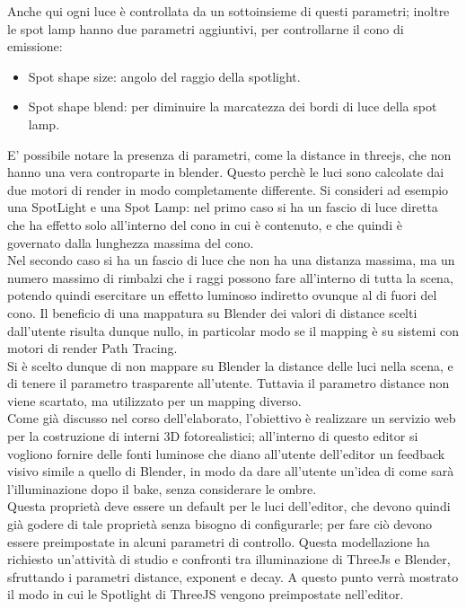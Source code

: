 Anche qui ogni luce è controllata da un sottoinsieme di questi parametri; inoltre le spot lamp hanno due parametri aggiuntivi, per controllarne il cono di emissione:
\begin{itemize}
\item Spot shape size: angolo del raggio della spotlight.
\item Spot shape blend: per diminuire la marcatezza dei bordi di luce della spot lamp.
\end{itemize}
E’ possibile notare la presenza di parametri, come la distance in threejs, che non hanno una vera controparte in blender. Questo perchè le luci sono calcolate dai due motori di render in modo completamente differente. Si consideri ad esempio una SpotLight e una Spot Lamp: nel primo caso si ha un fascio di luce diretta che ha effetto solo all’interno del cono in cui è contenuto, e che quindi è governato dalla lunghezza massima del cono. 
\\
Nel secondo caso si ha un fascio di luce che non ha una distanza massima, ma un numero massimo di rimbalzi che i raggi possono fare all’interno di tutta la scena, potendo quindi esercitare un effetto luminoso indiretto ovunque al di fuori del cono. Il beneficio di una mappatura su Blender dei valori di distance scelti dall’utente risulta dunque nullo, in particolar modo se il mapping è su sistemi con motori di render Path Tracing. 
\\
Si è scelto dunque di non mappare su Blender la distance delle luci nella scena, e di tenere il parametro trasparente all’utente. Tuttavia il parametro distance non viene scartato, ma utilizzato per un mapping diverso.
\\
Come già discusso nel corso dell’elaborato, l’obiettivo è realizzare un servizio web per la costruzione di interni 3D fotorealistici; all’interno di questo editor si vogliono fornire delle fonti luminose che diano all’utente dell’editor un feedback visivo simile a quello di Blender, in modo da dare all’utente un’idea di come sarà l’illuminazione dopo il bake, senza considerare le ombre. 
\\
Questa proprietà deve essere un default per le luci dell’editor, che devono quindi già godere di tale proprietà senza bisogno di configurarle; per fare ciò devono essere preimpostate in alcuni parametri di controllo. Questa modellazione ha richiesto un’attività di studio e confronti tra illuminazione di ThreeJs e Blender, sfruttando i parametri distance, exponent e decay. A questo punto verrà mostrato il modo in cui le Spotlight di ThreeJS vengono preimpostate nell’editor.
